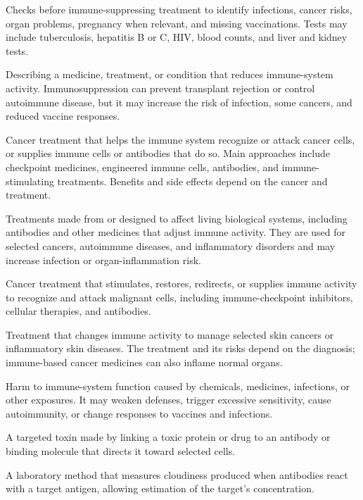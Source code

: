  Checks before immune-suppressing treatment to identify infections, cancer risks, organ problems, pregnancy when relevant, and missing vaccinations. Tests may include tuberculosis, hepatitis B or C, HIV, blood counts, and liver and kidney tests.

 Describing a medicine, treatment, or condition that reduces immune-system activity. Immunosuppression can prevent transplant rejection or control autoimmune disease, but it may increase the risk of infection, some cancers, and reduced vaccine responses.

 Cancer treatment that helps the immune system recognize or attack cancer cells, or supplies immune cells or antibodies that do so. Main approaches include checkpoint medicines, engineered immune cells, antibodies, and immune-stimulating treatments. Benefits and side effects depend on the cancer and treatment.

 Treatments made from or designed to affect living biological systems, including antibodies and other medicines that adjust immune activity. They are used for selected cancers, autoimmune diseases, and inflammatory disorders and may increase infection or organ-inflammation risk.

 Cancer treatment that stimulates, restores, redirects, or supplies immune activity to recognize and attack malignant cells, including immune-checkpoint inhibitors, cellular therapies, and antibodies.

 Treatment that changes immune activity to manage selected skin cancers or inflammatory skin diseases. The treatment and its risks depend on the diagnosis; immune-based cancer medicines can also inflame normal organs.

 Harm to immune-system function caused by chemicals, medicines, infections, or other exposures. It may weaken defenses, trigger excessive sensitivity, cause autoimmunity, or change responses to vaccines and infections.

 A targeted toxin made by linking a toxic protein or drug to an antibody or binding molecule that directs it toward selected cells.

 A laboratory method that measures cloudiness produced when antibodies react with a target antigen, allowing estimation of the target’s concentration.


